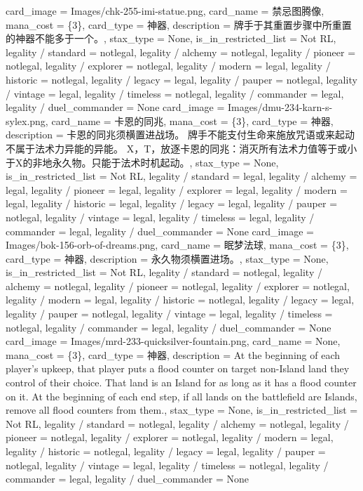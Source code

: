 \documentclass[lang = cn, color = black, 10pt]{AllThatStax}
\begin{document}
\card
{
	card_image = Images/chk-255-imi-statue.png,
	card_name = 禁忌图腾像,
	mana_cost = \{3\},
	card_type = 神器,
	description = 牌手于其重置步骤中所重置的神器不能多于一个。,
	stax_type = None,
	is_in_restricted_list = Not RL,
	legality / standard = notlegal,
	legality / alchemy = notlegal,
	legality / pioneer = notlegal,
	legality / explorer = notlegal,
	legality / modern = legal,
	legality / historic = notlegal,
	legality / legacy = legal,
	legality / pauper = notlegal,
	legality / vintage = legal,
	legality / timeless = notlegal,
	legality / commander = legal,
	legality / duel_commander = None
}
\card
{
	card_image = Images/dmu-234-karn-s-sylex.png,
	card_name = 卡恩的同兆,
	mana_cost = \{3\},
	card_type = 神器,
	description = 卡恩的同兆须横置进战场。
	牌手不能支付生命来施放咒语或来起动不属于法术力异能的异能。
	{X}，{T}，放逐卡恩的同兆：消灭所有法术力值等于或小于X的非地永久物。只能于法术时机起动。,
	stax_type = None,
	is_in_restricted_list = Not RL,
	legality / standard = legal,
	legality / alchemy = legal,
	legality / pioneer = legal,
	legality / explorer = legal,
	legality / modern = legal,
	legality / historic = legal,
	legality / legacy = legal,
	legality / pauper = notlegal,
	legality / vintage = legal,
	legality / timeless = legal,
	legality / commander = legal,
	legality / duel_commander = None
}
\card
{
	card_image = Images/bok-156-orb-of-dreams.png,
	card_name = 眠梦法球,
	mana_cost = \{3\},
	card_type = 神器,
	description = 永久物须横置进场。,
	stax_type = None,
	is_in_restricted_list = Not RL,
	legality / standard = notlegal,
	legality / alchemy = notlegal,
	legality / pioneer = notlegal,
	legality / explorer = notlegal,
	legality / modern = legal,
	legality / historic = notlegal,
	legality / legacy = legal,
	legality / pauper = notlegal,
	legality / vintage = legal,
	legality / timeless = notlegal,
	legality / commander = legal,
	legality / duel_commander = None
}
\card
{
	card_image = Images/mrd-233-quicksilver-fountain.png,
	card_name = None,
	mana_cost = \{3\},
	card_type = 神器,
	description = At the beginning of each player's upkeep, that player puts a flood counter on target non-Island land they control of their choice. That land is an Island for as long as it has a flood counter on it.
	At the beginning of each end step, if all lands on the battlefield are Islands, remove all flood counters from them.,
	stax_type = None,
	is_in_restricted_list = Not RL,
	legality / standard = notlegal,
	legality / alchemy = notlegal,
	legality / pioneer = notlegal,
	legality / explorer = notlegal,
	legality / modern = legal,
	legality / historic = notlegal,
	legality / legacy = legal,
	legality / pauper = notlegal,
	legality / vintage = legal,
	legality / timeless = notlegal,
	legality / commander = legal,
	legality / duel_commander = None
}
\end{document}
